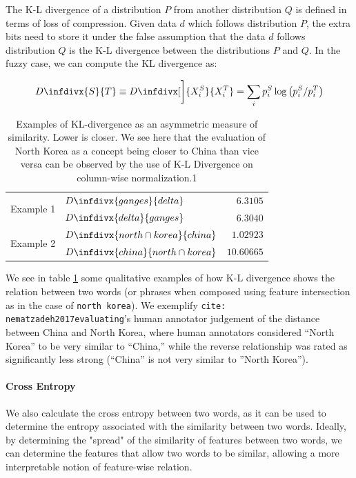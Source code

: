 \documentclass[11pt]{book}
\newcommand{\infdiv}{D\infdivx}
\newcommand{\citet}[1]{\texttt{cite: #1}}
\begin{document}
The K-L divergence of a distribution $P$ from another distribution $Q$ is
defined in terms of loss of compression. Given data $d$ which follows
distribution $P$, the extra bits need to store it under the false assumption
that the data $d$ follows distribution $Q$ is the K-L divergence between the
distributions $P$ and $Q$. In the fuzzy case, we can compute the KL divergence
as:

{\footnotesize
\begin{equation*}
     \infdiv{S}{T} \equiv \infdiv[\bigg]{X^S_i}{X^T_i} =  \sum_i p^S_i \log \left( p^S_i / p^T_i \right) 
\end{equation*}
}

\begin{table}[]
    \centering
    {\small
    \begin{tabular}{clr}
        \multirow{2}{*}{Example 1} & $\infdiv{ganges}{delta}$ & $6.3105$  \\
                                   & $\infdiv{delta}{ganges}$ & $6.3040$  \\
        \multirow{2}{*}{Example 2} & $\infdiv{north \cap korea}{china}$ & $1.02923$ \\
                                   & $\infdiv{china}{north \cap korea}$ & $10.60665$
    \end{tabular}
    }
    \caption{Examples of KL-divergence as an asymmetric measure of similarity. Lower is closer. We see here that the evaluation of North Korea as a concept being closer to China than vice versa can be observed by the use of K-L Divergence on column-wise normalization.1}
    \label{tab: k-l divergence}
\end{table}

We see in table \ref{tab: k-l divergence} some qualitative examples of how K-L
divergence shows the relation between two words (or phrases when composed using
feature intersection as in the case of \texttt{north korea}). We exemplify
\citet{nematzadeh2017evaluating}'s human annotator judgement of the distance
between China and North Korea, where human annotators considered “North Korea”
to be very similar to “China,” while the reverse relationship was rated as
significantly less strong (“China” is not very similar to ”North Korea”).

\paragraph{Cross Entropy} We also calculate the cross entropy between two
words, as it can be used to determine the entropy associated with the
similarity between two words. Ideally, by determining the "spread" of the
similarity of features between two words, we can determine the features that
allow two words to be similar, allowing a more interpretable notion of
feature-wise relation. 
\end{document}
